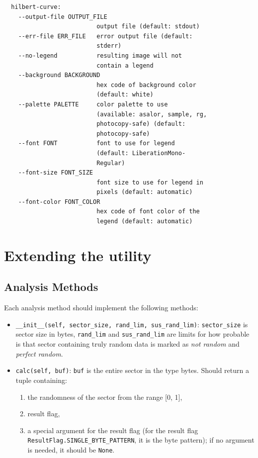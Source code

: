 \documentclass[
  digital, %
  color,   %
  oneside, %
  lof,     %
  nolot,     %
]{fithesis4}
\begin{document}
\begin{verbatim}
  hilbert-curve:
    --output-file OUTPUT_FILE
                          output file (default: stdout)
    --err-file ERR_FILE   error output file (default:
                          stderr)
    --no-legend           resulting image will not
                          contain a legend
    --background BACKGROUND
                          hex code of background color
                          (default: white)
    --palette PALETTE     color palette to use
                          (available: asalor, sample, rg,
                          photocopy-safe) (default:
                          photocopy-safe)
    --font FONT           font to use for legend
                          (default: LiberationMono-
                          Regular)
    --font-size FONT_SIZE
                          font size to use for legend in
                          pixels (default: automatic)
    --font-color FONT_COLOR
                          hex code of font color of the
                          legend (default: automatic)
\end{verbatim}

\chapter{Extending the utility}
\section{Analysis Methods}

Each analysis method should implement the following methods:
\begin{itemize}
  \item \texttt{\_\_init\_\_(self, sector\_size, rand\_lim, sus\_rand\_lim)}: \texttt{sector\_size} is sector size in bytes, \texttt{rand\_lim} and \texttt{sus\_rand\_lim} are limits for how probable is that sector containing truly random data is marked as \emph{not random} and \emph{perfect random}.
  \item \texttt{calc(self, buf)}: \texttt{buf} is the entire sector in the type bytes.
    Should return a tuple containing:
    \begin{enumerate}
      \item the randomness of the sector from the range [0, 1],
      \item result flag,
      \item a special argument for the result flag (for the result flag \texttt{ResultFlag.SINGLE\_BYTE\_PATTERN}, it is the byte pattern); if no argument is needed, it should be \texttt{None}.
    \end{enumerate}
\end{itemize}
\end{document}
